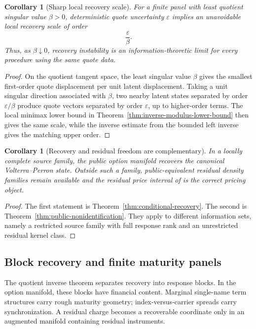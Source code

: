 \documentclass[11pt,a4paper]{amsart}
\theoremstyle{plain}
\newtheorem{corollary}[theorem]{Corollary}
\theoremstyle{definition}
\theoremstyle{remark}
\begin{document}
\begin{corollary}[Sharp local recovery scale]\label{cor:sharp-local-recovery-scale}
For a finite panel with least quotient singular value \(\beta>0\), deterministic quote
uncertainty \(\varepsilon\) implies an unavoidable local recovery scale of order
\[
        \frac{\varepsilon}{\beta}.
\]
Thus, as \(\beta\downarrow0\), recovery instability is an information-theoretic limit for every
procedure using the same quote data.
\end{corollary}

\begin{proof}
On the quotient tangent space, the least singular value \(\beta\) gives the smallest first-order
quote displacement per unit latent displacement.  Taking a unit singular direction associated with
\(\beta\), two nearby latent states separated by order \(\varepsilon/\beta\) produce quote vectors
separated by order \(\varepsilon\), up to higher-order terms.  The local minimax lower bound in
Theorem~\ref{thm:inverse-modulus-lower-bound} then gives the same scale, while the inverse estimate
from the bounded left inverse gives the matching upper order.
\end{proof}


\begin{corollary}[Recovery and residual freedom are complementary]\label{cor:recovery-complementarity}
In a locally complete source family, the public option manifold recovers the canonical
Volterra--Perron state.  Outside such a family, public-equivalent residual density families remain
available and the residual price interval of \cite{vidal2026pricing} is the correct pricing
object.
\end{corollary}

\begin{proof}
The first statement is Theorem~\ref{thm:conditional-recovery}.  The second is
Theorem~\ref{thm:public-nonidentification}.  They apply to different information sets, namely a
restricted source family with full response rank and an unrestricted residual kernel class.
\end{proof}

\subsection{Block recovery and finite maturity panels}

The quotient inverse theorem separates recovery into response blocks.  In the option manifold,
these blocks have financial content.  Marginal single-name term structures carry rough maturity
geometry; index-versus-carrier spreads carry synchronization.  A residual charge becomes a
recoverable coordinate only in an augmented manifold containing residual instruments.
\end{document}
